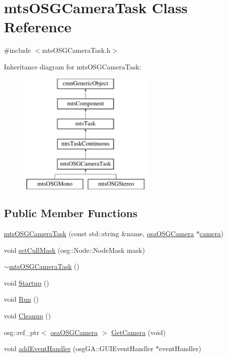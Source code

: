 \hypertarget{classmts_o_s_g_camera_task}{}\section{mts\+O\+S\+G\+Camera\+Task Class Reference}
\label{classmts_o_s_g_camera_task}


{\ttfamily \#include $<$mts\+O\+S\+G\+Camera\+Task.\+h$>$}

Inheritance diagram for mts\+O\+S\+G\+Camera\+Task\+:\begin{figure}[H]
\begin{center}
\leavevmode
\includegraphics[height=6.000000cm]{de/d6e/classmts_o_s_g_camera_task}
\end{center}
\end{figure}
\subsection*{Public Member Functions}
\begin{DoxyCompactItemize}
\item 
\hyperlink{classmts_o_s_g_camera_task_a534e20ad8b48af77e77a6b351ff91534}{mts\+O\+S\+G\+Camera\+Task} (const std\+::string \&name, \hyperlink{classosa_o_s_g_camera}{osa\+O\+S\+G\+Camera} $\ast$\hyperlink{classmts_o_s_g_camera_task_acdbb6886bc066f06c2fb26be44b60534}{camera})
\item 
void \hyperlink{classmts_o_s_g_camera_task_adfe692d057b79007c782d1dc3cb96746}{set\+Cull\+Mask} (osg\+::\+Node\+::\+Node\+Mask mask)
\item 
\hyperlink{classmts_o_s_g_camera_task_a0e5a701e5517c8f272ee4cb62751c962}{$\sim$mts\+O\+S\+G\+Camera\+Task} ()
\item 
void \hyperlink{classmts_o_s_g_camera_task_a4fcd1a7364cc5f6cb05951f361ea0568}{Startup} ()
\item 
void \hyperlink{classmts_o_s_g_camera_task_a017d41a7a6dbfced2a43c81daa98e6a0}{Run} ()
\item 
void \hyperlink{classmts_o_s_g_camera_task_a814157c6b87931efb472fb6aedb69174}{Cleanup} ()
\item 
osg\+::ref\+\_\+ptr$<$ \hyperlink{classosa_o_s_g_camera}{osa\+O\+S\+G\+Camera} $>$ \hyperlink{classmts_o_s_g_camera_task_a1ea4dc187d6f023fef7fd25b18ad5c65}{Get\+Camera} (void)
\item 
void \hyperlink{classmts_o_s_g_camera_task_afd090cb089b7dec5a4cd32c228a2cda7}{add\+Event\+Handler} (osg\+G\+A\+::\+G\+U\+I\+Event\+Handler $\ast$event\+Handler)
\end{DoxyCompactItemize}
